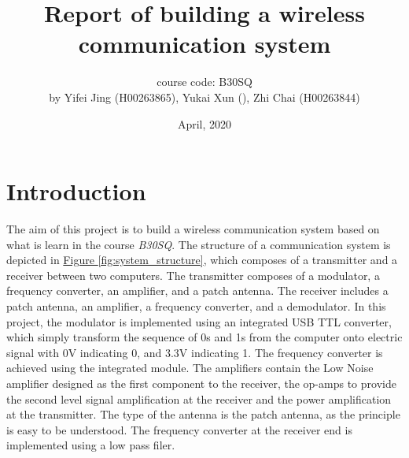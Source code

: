\documentclass[12pt,a4paper]{report}
\begin{document}
    \title{Report of building a wireless communication system}

    \author{course code: B30SQ \\ by Yifei Jing (H00263865), Yukai Xun (), Zhi Chai (H00263844)}
    \date{April, 2020}
    \maketitle
    \setlength\parindent{0pt}

    \cleardoublepage  
    \tableofcontents

    \cleardoublepage  
    \listoffigures

    \cleardoublepage  
    \listoftables

\chapter{Introduction}
The aim of this project is to build a wireless communication system based on what is learn in the course \emph{B30SQ}.
The structure of a communication system is depicted in \hyperref[fig:system_structure]{Figure \ref*{fig:system_structure}}, which composes of a transmitter and a receiver between two computers.
The transmitter composes of a modulator, a frequency converter, an amplifier, and a patch antenna. The receiver includes a patch antenna, an amplifier, a frequency converter, and a demodulator.
In this project, the modulator is implemented using an integrated USB TTL converter, which simply transform the sequence of 0s and 1s from the computer onto electric signal with 0V indicating 0, and 3.3V indicating 1. The frequency converter is achieved using the integrated module.
The amplifiers contain the Low Noise amplifier designed as the first component to the receiver, the op-amps to provide the second level signal amplification at the receiver and the power amplification at the transmitter.
The type of the antenna is the patch antenna, as the principle is easy to be understood. The frequency converter at the receiver end is implemented using a low pass filer.
\end{document}
